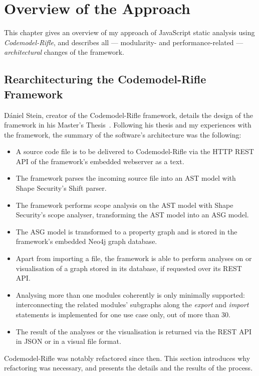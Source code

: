 \chapter{Overview of the Approach}
\label{chapter:overview}

This chapter gives an overview of my approach of JavaScript static analysis using \emph{Codemodel-Rifle}, and describes all — modularity- and performance-related — \emph{architectural} changes of the framework.


\section{Rearchitecturing the Codemodel-Rifle Framework}

Dániel Stein, creator of the Codemodel-Rifle framework, details the design of the framework in his Master's Thesis~\cite{stein-daniel-msc}. Following his thesis and my experiences with the framework, the summary of the software's architecture was the following:

\begin{itemize}
\item A source code file is to be delivered to Codemodel-Rifle via the HTTP REST API of the framework's embedded webserver as a text.
\item The framework parses the incoming source file into an AST model with Shape Security's Shift parser.
\item The framework performs scope analysis on the AST model with Shape Security's scope analyser, transforming the AST model into an ASG model.
\item The ASG model is transformed to a property graph and is stored in the framework's embedded Neo4j graph database.
\item Apart from importing a file, the framework is able to perform analyses on or visualisation of a graph stored in its database, if requested over its REST API.
\item Analysing more than one \es modules coherently is only minimally supported: interconnecting the related modules' subgraphs along the \emph{export} and \emph{import} \es statements is implemented for one use case only, out of more than 30.
\item The result of the analyses or the visualisation is returned via the REST API in JSON or in a visual file format.
\end{itemize}

Codemodel-Rifle was notably refactored since then. This section introduces why refactoring was necessary, and presents the details and the results of the process.


